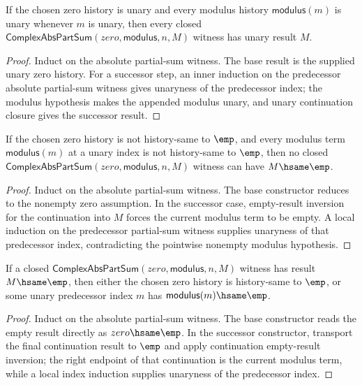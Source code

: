 \begin{theorem}
\label{thm:complex-abs-part-sum-result-unary}
If the chosen zero history is unary and every modulus history
$\mathsf{modulus}(m)$ is unary whenever $m$ is unary, then every closed
$\mathsf{ComplexAbsPartSum}(zero,\mathsf{modulus},n,M)$ witness has unary
result $M$.
\end{theorem}
\begin{proof}
Induct on the absolute partial-sum witness. The base result is the supplied
unary zero history. For a successor step, an inner induction on the predecessor
absolute partial-sum witness gives unaryness of the predecessor index; the
modulus hypothesis makes the appended modulus unary, and unary continuation
closure gives the successor result.
\end{proof}

\begin{lemma}
\label{lem:complex-abs-part-sum-result-nonempty-of-nonempty-terms}
If the chosen zero history is not history-same to \(\emp\), and every modulus
term \(\mathsf{modulus}(m)\) at a unary index is not history-same to \(\emp\),
then no closed \(\mathsf{ComplexAbsPartSum}(zero,\mathsf{modulus},n,M)\)
witness can have \(M\hsame\emp\).
\end{lemma}
\begin{proof}
Induct on the absolute partial-sum witness. The base constructor reduces to
the nonempty zero assumption. In the successor case, empty-result inversion for
the continuation into \(M\) forces the current modulus term to be empty. A
local induction on the predecessor partial-sum witness supplies unaryness of
that predecessor index, contradicting the pointwise nonempty modulus
hypothesis.
\end{proof}

\begin{theorem}
\label{thm:complex-abs-part-sum-empty-result-boundary}
If a closed $\mathsf{ComplexAbsPartSum}(zero,\mathsf{modulus},n,M)$ witness
has result $M\hsame\emp$, then either the chosen zero history is
history-same to $\emp$, or some unary predecessor index $m$ has
$\mathsf{modulus}(m)\hsame\emp$.
\end{theorem}
\begin{proof}
Induct on the absolute partial-sum witness. The base constructor reads the
empty result directly as $zero\hsame\emp$. In the successor constructor,
transport the final continuation result to $\emp$ and apply continuation
empty-result inversion; the right endpoint of that continuation is the current
modulus term, while a local index induction supplies unaryness of the
predecessor index.
\end{proof}

